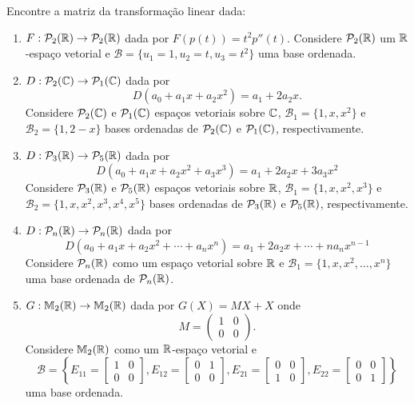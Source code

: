 \documentclass[12pt]{exam}
\begin{document}
\begin{exercicio}
    Encontre a matriz da transformação linear dada:
    \begin{enumerate}[label={\alph*})]
        \item $F : \mathcal{P}_2(\mathbb{R}) \to \mathcal{P}_2(\mathbb{R})$ dada por $F(p(t)) = t^2p''(t)$. Considere $\mathcal{P}_2(\mathbb{R})$ um $\mathbb{R}$-espaço vetorial e $\mathcal{B} = \{u_1 = 1, u_2 = t, u_3 = t^2\}$ uma base ordenada.

        \item $D : \mathcal{P}_2(\mathbb{C}) \to \mathcal{P}_1(\mathbb{C})$ dada por
        \[
        D(a_0 + a_1x + a_2x^2) = a_1 + 2a_2x.
        \]
        Considere $\mathcal{P}_2(\mathbb{C})$ e $\mathcal{P}_1(\mathbb{C})$ espaços vetoriais sobre $\mathbb{C}$, $\mathcal{B}_1 = \{1, x, x^2\}$ e $\mathcal{B}_2 = \{1, 2 - x\}$ bases ordenadas de $\mathcal{P}_2(\mathbb{C})$ e $\mathcal{P}_1(\mathbb{C})$, respectivamente.

        \item $D : \mathcal{P}_3(\mathbb{R}) \to \mathcal{P}_5(\mathbb{R})$ dada por
        \[
        D(a_0 + a_1x + a_2x^2 + a_3x^3) = a_1 + 2a_2x + 3a_3x^2
        \]
        Considere $\mathcal{P}_3(\mathbb{R})$ e $\mathcal{P}_5(\mathbb{R})$ espaços vetoriais sobre $\mathbb{R}$, $\mathcal{B}_1 = \{1, x, x^2, x^3\}$ e $\mathcal{B}_2 = \{1, x, x^2, x^3, x^4, x^5\}$ bases ordenadas de $\mathcal{P}_3(\mathbb{R})$ e $\mathcal{P}_5(\mathbb{R})$, respectivamente.

        \item $D : \mathcal{P}_n(\mathbb{R}) \to \mathcal{P}_n(\mathbb{R})$ dada por
        \[
        D(a_0 + a_1x + a_2x^2 + \cdots + a_nx^n) = a_1 + 2a_2x + \cdots + na_nx^{n-1}
        \]
        Considere $\mathcal{P}_n(\mathbb{R})$ como um espaço vetorial sobre $\mathbb{R}$ e $\mathcal{B}_1 = \{1, x, x^2, \dots, x^n\}$ uma base ordenada de $\mathcal{P}_n(\mathbb{R})$.

        \item $G : \mathbb{M}_2(\mathbb{R}) \to \mathbb{M}_2(\mathbb{R})$ dada por $G(X) = MX + X$ onde
        \[
        M = \begin{pmatrix}
            1 & 0\\
            0 & 0
        \end{pmatrix}.
        \]
        Considere $\mathbb{M}_2(\mathbb{R})$ como um $\mathbb{R}$-espaço vetorial e
        \[
        \mathcal{B} = \left\{E_{11} = \begin{bmatrix}
            1 & 0\\0 & 0
        \end{bmatrix}, E_{12} = \begin{bmatrix}
            0 & 1\\0 & 0
        \end{bmatrix}, E_{21} = \begin{bmatrix}
            0 & 0\\1 & 0
        \end{bmatrix}, E_{22} = \begin{bmatrix}
            0 & 0\\0 & 1
        \end{bmatrix}\right\}
        \]
        uma base ordenada.


\end{enumerate}
\end{exercicio}
\end{document}
